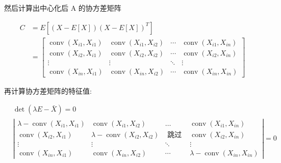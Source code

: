 然后计算出中心化后 A 的协方差矩阵

\begin{tiny}
	\begin{equation}
\begin{aligned}
C &=E\left[(X-E[X])(X-E[X])^T\right] \\
&=\left[\begin{array}{cccc}
\operatorname{conv}\left(X_{i 1}, X_{i 1}\right) & \operatorname{conv}\left(X_{i 1}, X_{i 2}\right) & \cdots & \operatorname{conv}\left(X_{i 1}, X_{i n}\right) \\
\operatorname{conv}\left(X_{i 2}, X_{i 1}\right) & \operatorname{conv}\left(X_{i 2}, X_{i 2}\right) & \cdots & \operatorname{conv}\left(X_{i 2}, X_{i n}\right) \\
\vdots & \vdots & \ddots & \vdots \\
\operatorname{conv}\left(X_{i n}, X_{i 1}\right) & \operatorname{conv}\left(X_{i n}, X_{i 2}\right) & \cdots & \operatorname{conv}\left(X_{i n}, X_{i n}\right)
\end{array}\right]
\end{aligned}
\end{equation}
\end{tiny}


再计算协方差矩阵的特征值:

\begin{tiny}
\begin{equation}
\begin{aligned}
&\operatorname{det}(\lambda E-\bar{X})=0 \\
&\left|\begin{array}{cccc}
\lambda-\operatorname{conv}\left(X_{i 1}, X_{i 1}\right) & \operatorname{conv}\left(X_{i 1}, X_{i 2}\right) & \ldots & \operatorname{conv}\left(X_{i 1}, X_{i n}\right) \\
\operatorname{conv}\left(X_{i 2}, X_{i 1}\right) & \lambda-\operatorname{conv}\left(X_{i 2}, X_{i 2}\right) & \text { 跳过 } & \operatorname{conv}\left(X_{i 2}, X_{i n}\right) \\
\vdots & \vdots & \ddots & \vdots \\
\operatorname{conv}\left(X_{i n}, X_{i 1}\right) & \operatorname{conv}\left(X_{i n}, X_{i 2}\right) & \cdots & \lambda-\operatorname{conv}\left(X_{i n}, X_{i n}\right)
\end{array}\right|=0 \\
&
\end{aligned}
\end{equation}	
\end{tiny}

